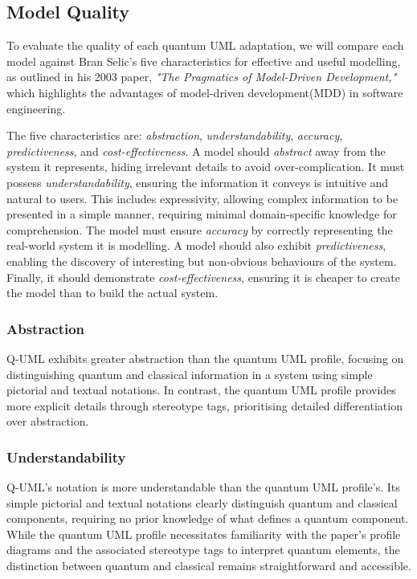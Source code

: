 \documentclass{article}
\begin{document}
\subsection{Model Quality}

To evaluate the quality of each quantum UML adaptation, we will compare each model against Bran Selic's five characteristics for effective and useful modelling, as outlined in his 2003 paper, \textit{"The Pragmatics of Model-Driven Development,"} which highlights the advantages of model-driven development(MDD) in software engineering\cite{1231146}.

The five characteristics are: \textit{abstraction}, \textit{understandability}, \textit{accuracy}, \textit{predictiveness}, and \textit{cost-effectiveness}. A model should \textit{abstract} away from the system it represents, hiding irrelevant details to avoid over-complication. It must possess \textit{understandability}, ensuring the information it conveys is intuitive and natural to users. This includes expressivity, allowing complex information to be presented in a simple manner, requiring minimal domain-specific knowledge for comprehension. The model must ensure \textit{accuracy} by correctly representing the real-world system it is modelling. A model should also exhibit \textit{predictiveness}, enabling the discovery of interesting but non-obvious behaviours of the system. Finally, it should demonstrate \textit{cost-effectiveness}, ensuring it is cheaper to create the model than to build the actual system\cite{1231146}.

\subsubsection{Abstraction}

Q-UML exhibits greater abstraction than the quantum UML profile, focusing on distinguishing quantum and classical information in a system using simple pictorial and textual notations. In contrast, the quantum UML profile provides more explicit details through stereotype tags, prioritising detailed differentiation over abstraction.

\subsubsection{Understandability}

Q-UML's notation is more understandable than the quantum UML profile's. Its simple pictorial and textual notations clearly distinguish quantum and classical components, requiring no prior knowledge of what defines a quantum component. While the quantum UML profile necessitates familiarity with the paper's profile diagrams and the associated stereotype tags to interpret quantum elements, the distinction between quantum and classical remains straightforward and accessible.
\end{document}
